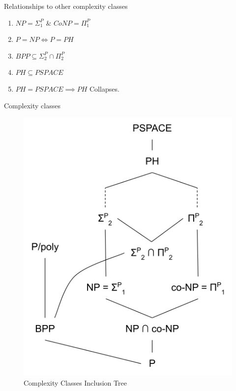         \begin{frame}{Relationships to other  complexity classes}   
            \begin{enumerate}
                \item $NP = \Sigma_1^P $ $\&$ $ CoNP = \Pi_1^P$
                \pause
                \item $P = NP \iff P = PH$
                \pause
                \item $BPP \subseteq \Sigma_2^P \cap \Pi_2^P $
                \pause
                \item $PH \subseteq PSPACE$
                \pause
                \item $PH = PSPACE \implies PH$ Collapses.
            \end{enumerate}
        \end{frame}
        
        \begin{frame}{Complexity classes}            
            \begin{figure}
                \centering
                \includegraphics[scale=0.5]{images/PH2.png}
                \caption{Complexity Classes Inclusion Tree}
                \label{fig:focuslogo}
            \end{figure}
        \end{frame}